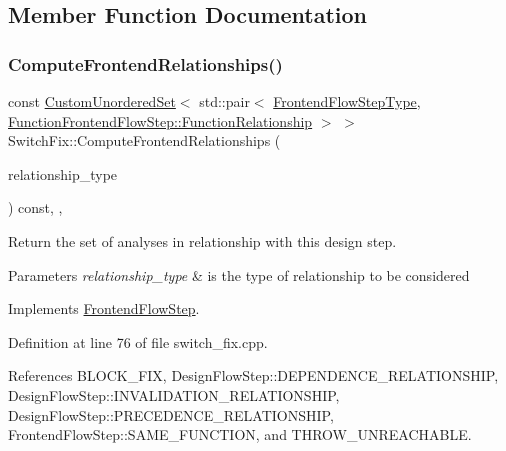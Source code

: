 \subsection{Member Function Documentation}
\mbox{\label{classSwitchFix_a7e25f29f6955c0a29ce90f345a3fcd08}} 
\subsubsection{\texorpdfstring{Compute\+Frontend\+Relationships()}{ComputeFrontendRelationships()}}
{\footnotesize\ttfamily const \hyperlink{classCustomUnorderedSet}{Custom\+Unordered\+Set}$<$ std\+::pair$<$ \hyperlink{frontend__flow__step_8hpp_afeb3716c693d2b2e4ed3e6d04c3b63bb}{Frontend\+Flow\+Step\+Type}, \hyperlink{classFrontendFlowStep_af7cf30f2023e5b99e637dc2058289ab0}{Function\+Frontend\+Flow\+Step\+::\+Function\+Relationship} $>$ $>$ Switch\+Fix\+::\+Compute\+Frontend\+Relationships (\begin{DoxyParamCaption}\item[{const \hyperlink{classDesignFlowStep_a723a3baf19ff2ceb77bc13e099d0b1b7}{Design\+Flow\+Step\+::\+Relationship\+Type}}]{relationship\+\_\+type }\end{DoxyParamCaption}) const\hspace{0.3cm}{\ttfamily [override]}, {\ttfamily [private]}, {\ttfamily [virtual]}}



Return the set of analyses in relationship with this design step. 


\begin{DoxyParams}{Parameters}
{\em relationship\+\_\+type} & is the type of relationship to be considered \\
\hline
\end{DoxyParams}


Implements \hyperlink{classFrontendFlowStep_abeaff70b59734e462d347ed343dd700d}{Frontend\+Flow\+Step}.



Definition at line 76 of file switch\+\_\+fix.\+cpp.



References B\+L\+O\+C\+K\+\_\+\+F\+IX, Design\+Flow\+Step\+::\+D\+E\+P\+E\+N\+D\+E\+N\+C\+E\+\_\+\+R\+E\+L\+A\+T\+I\+O\+N\+S\+H\+IP, Design\+Flow\+Step\+::\+I\+N\+V\+A\+L\+I\+D\+A\+T\+I\+O\+N\+\_\+\+R\+E\+L\+A\+T\+I\+O\+N\+S\+H\+IP, Design\+Flow\+Step\+::\+P\+R\+E\+C\+E\+D\+E\+N\+C\+E\+\_\+\+R\+E\+L\+A\+T\+I\+O\+N\+S\+H\+IP, Frontend\+Flow\+Step\+::\+S\+A\+M\+E\+\_\+\+F\+U\+N\+C\+T\+I\+ON, and T\+H\+R\+O\+W\+\_\+\+U\+N\+R\+E\+A\+C\+H\+A\+B\+LE.

